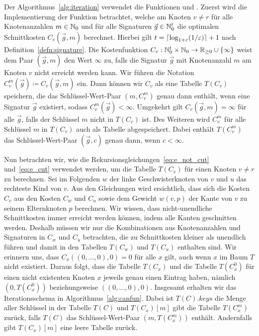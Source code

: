 Der Algorithmus~\ref{alg:iteration} verwendet die Funktionen \canfun{} und \carfun{}.
Zuerst wird die Implementierung der Funktion \canfun{} betrachtet, welche am Knoten $v \neq r$ für alle Knotenanzahlen $m \in \mathbb{N}_0$ und für alle Signaturen $\vec{g} \in \mathbb{N}_0^t$ die optimalen Schnittkosten $C_v(\vec{g}, m)$ berechnet.
Hierbei gilt $t = \lceil\log_{1+\varepsilon}(1/\varepsilon)\rceil + 1$ nach Definition~\ref{defn:signature}.
Die Kostenfunktion $C_v : \mathbb{N}_0^t \times \mathbb{N}_0 \rightarrow \mathbb{R}_{\geq 0} \cup \{\infty\}$ weist dem Paar $(\vec{g}, m)$ den Wert $\infty$ zu, falls die Signatur $\vec{g}$ mit Knotenanzahl $m$ am Knoten $v$ nicht erreicht werden kann.
Wir führen die Notation $C^m_v(\vec{g}) \coloneqq C_v(\vec{g}, m)$ ein.
Dann können wir $C_v$ als eine Tabelle $T(C_v)$ speichern, die das Schlüssel-Wert-Paar $(m,C^m_v)$ genau dann enthält, wenn eine Signatur $\vec{g}$ existiert, sodass $C^m_v(\vec{g}) < \infty$.
Umgekehrt gilt $C_v(\vec{g}, m) = \infty$ für alle $\vec{g}$, falls der Schlüssel $m$ nicht in $T(C_v)$ ist.
Des Weiteren wird $C_v^m$ für alle Schlüssel $m$ in $T(C_v)$ auch als Tabelle abgespeichert.
Dabei enthält $T(C_v^m)$ das Schlüssel-Wert-Paar $(\vec{g}, c)$ genau dann, wenn $c < \infty$.

Nun betrachten wir, wie die Rekursionsgleichungen~\eqref{eq:e_not_cut} und~\eqref{eq:e_cut} verwendet werden, um die Tabelle $T(C_v)$ für einen Knoten $v \neq r$ zu berechnen.
Sei im Folgenden $w$ der linke Geschwisterknoten von $v$ und $u$ das rechteste Kind von $v$.
Aus den Gleichungen wird ersichtlich, dass sich die Kosten $C_v$ aus den Kosten $C_w$ und $C_u$ sowie dem Gewicht $w(v, p)$ der Kante von $v$ zu seinem Elternknoten $p$ berechnen.
Wir wissen, dass nicht-unendliche Schnittkosten immer erreicht werden können, indem alle Kanten geschnitten werden.
Deshalb müssen wir nur die Kombinationen aus Knotenanzahlen und Signaturen in $C_w$ und $C_u$ betrachten, die zu Schnittkosten kleiner als unendlich führen und damit in den Tabellen $T(C_w)$ und $T(C_u)$ enthalten sind.
Wir erinnern uns, dass $C_x((0,\ldots, 0),0) = 0$ für alle $x$ gilt, auch wenn $x$ im Baum $T$ nicht existiert.
Daraus folgt, dass die Tabelle $T(C_x)$ und die Tabelle $T(C^0_x)$ für einen nicht existenten Knoten $x$ jeweils genau einen Eintrag haben, nämlich $(0, T(C^0_x))$ beziehungsweise $((0,\ldots,0), 0)$.
Insgesamt erhalten wir das Iterationsschema in Algorithmus~\ref{alg:canfun}.
Dabei ist $T(C).keys$ die Menge aller Schlüssel in der Tabelle $T(C)$ und $T(C_x)[m]$ gibt die Tabelle $T(C^m_x)$ zurück, falls $T(C)$ das Schlüssel-Wert-Paar $(m, T(C^m_x))$ enthält.
Andernfalls gibt $T(C_x)[m]$ eine leere Tabelle zurück.


